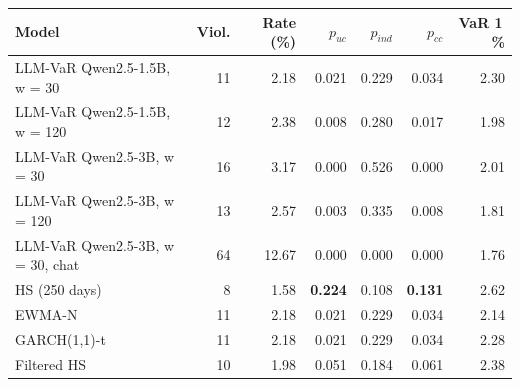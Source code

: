 \begin{tabular}{lrrrrrr}
\toprule
Model & Viol. & Rate (\%) & $p_{uc}$ & $p_{ind}$ & $p_{cc}$ & VaR 1\,\% \\
\midrule
LLM-VaR Qwen2.5-1.5B, w = 30 & 11 & 2.18 & 0.021 & 0.229 & 0.034 & 2.30 \\
LLM-VaR Qwen2.5-1.5B, w = 120 & 12 & 2.38 & 0.008 & 0.280 & 0.017 & 1.98 \\
LLM-VaR Qwen2.5-3B, w = 30 & 16 & 3.17 & 0.000 & 0.526 & 0.000 & 2.01 \\
LLM-VaR Qwen2.5-3B, w = 120 & 13 & 2.57 & 0.003 & 0.335 & 0.008 & 1.81 \\
LLM-VaR Qwen2.5-3B, w = 30, chat & 64 & 12.67 & 0.000 & 0.000 & 0.000 & 1.76 \\
HS (250 days) & 8 & 1.58 & \textbf{0.224} & 0.108 & \textbf{0.131} & 2.62 \\
EWMA-N & 11 & 2.18 & 0.021 & 0.229 & 0.034 & 2.14 \\
GARCH(1,1)-t & 11 & 2.18 & 0.021 & 0.229 & 0.034 & 2.28 \\
Filtered HS & 10 & 1.98 & 0.051 & 0.184 & 0.061 & 2.38 \\
\bottomrule
\end{tabular}
